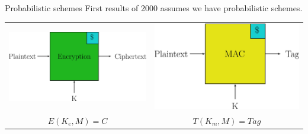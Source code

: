 \documentclass[11pt]{beamer}
\begin{document}
\begin{frame}{Probabilistic schemes}
First results of 2000 assumes we have probabilistic schemes.

\begin{center}
\begin{tabular}{ c c }
\includegraphics[scale=0.08]{probEnc.jpg} & \includegraphics[scale=0.08]{probMac.jpg} \\
	$E(K_e, M) = C$ & $T(K_m, M) = Tag$
\end{tabular}
\end{center}
\end{frame}
\end{document}
